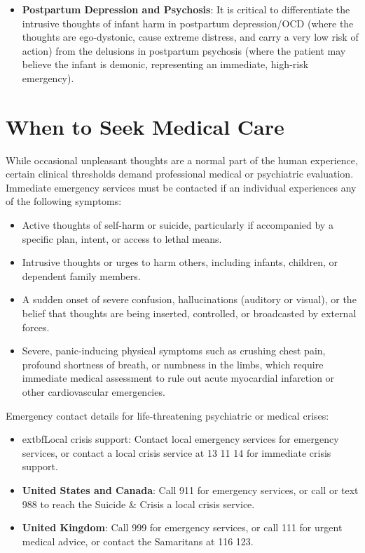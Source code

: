 \begin{itemize}
  \item \textbf{Postpartum Depression and Psychosis}: It is critical to differentiate the intrusive thoughts of infant harm in postpartum depression/OCD (where the thoughts are ego-dystonic, cause extreme distress, and carry a very low risk of action) from the delusions in postpartum psychosis (where the patient may believe the infant is demonic, representing an immediate, high-risk emergency).
\end{itemize}

\section*{When to Seek Medical Care}
While occasional unpleasant thoughts are a normal part of the human experience, certain clinical thresholds demand professional medical or psychiatric evaluation. Immediate emergency services must be contacted if an individual experiences any of the following symptoms:
\begin{itemize}
  \item Active thoughts of self-harm or suicide, particularly if accompanied by a specific plan, intent, or access to lethal means.
  \item Intrusive thoughts or urges to harm others, including infants, children, or dependent family members.
  \item A sudden onset of severe confusion, hallucinations (auditory or visual), or the belief that thoughts are being inserted, controlled, or broadcasted by external forces.
  \item Severe, panic-inducing physical symptoms such as crushing chest pain, profound shortness of breath, or numbness in the limbs, which require immediate medical assessment to rule out acute myocardial infarction or other cardiovascular emergencies.
\end{itemize}

Emergency contact details for life-threatening psychiatric or medical crises:
\begin{itemize}
  \item 	extbf{Local crisis support}: Contact local emergency services for emergency services, or contact a local crisis service at 13 11 14 for immediate crisis support.
  \item \textbf{United States and Canada}: Call 911 for emergency services, or call or text 988 to reach the Suicide \& Crisis a local crisis service.
  \item \textbf{United Kingdom}: Call 999 for emergency services, or call 111 for urgent medical advice, or contact the Samaritans at 116 123.
\end{itemize}

